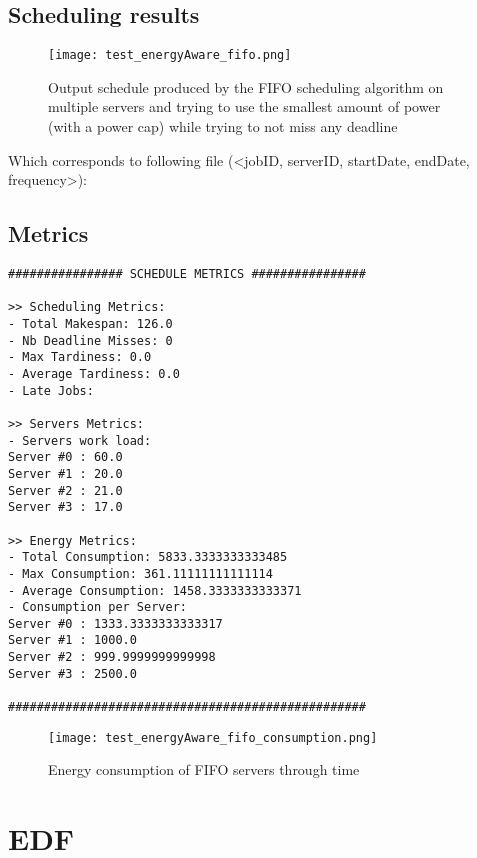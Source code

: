 \documentclass[./report.tex]{subfiles}
\begin{document}
\newpage
\subsection{Scheduling results}
\begin{figure}[!h]
	\center
	\texttt{[image: test\_energyAware\_fifo.png]}
	\caption{Output schedule produced by the FIFO scheduling algorithm on multiple servers and trying to use the smallest amount of power (with a power cap) while trying to not miss any deadline}
	\label{fig:energyAware_fifo} 
\end{figure}

Which corresponds to following file (<jobID, serverID, startDate, endDate, frequency>):


\newpage
\subsection{Metrics}
\begin{lstlisting}[style=txt, caption={Metrics for FIFO on multiple energy aware servers}]
################ SCHEDULE METRICS ################

>> Scheduling Metrics: 
- Total Makespan: 126.0
- Nb Deadline Misses: 0
- Max Tardiness: 0.0
- Average Tardiness: 0.0
- Late Jobs: 

>> Servers Metrics: 
- Servers work load:
Server #0 : 60.0
Server #1 : 20.0
Server #2 : 21.0
Server #3 : 17.0

>> Energy Metrics: 
- Total Consumption: 5833.3333333333485
- Max Consumption: 361.11111111111114
- Average Consumption: 1458.3333333333371
- Consumption per Server: 
Server #0 : 1333.3333333333317
Server #1 : 1000.0
Server #2 : 999.9999999999998
Server #3 : 2500.0

##################################################
\end{lstlisting}

\begin{figure}[!h]
	\center
	\hspace*{-5em} \texttt{[image: test\_energyAware\_fifo\_consumption.png]}
	\caption{Energy consumption of FIFO servers through time}
	\label{fig:fifo_consumption} 
\end{figure}


\newpage
\section{EDF}
\end{document}
